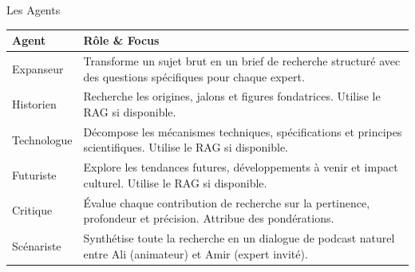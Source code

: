 \documentclass[aspectratio=169, 11pt]{beamer}
\begin{document}
\begin{frame}{Les Agents}
\vspace{0.1cm}
\centering
\footnotesize
\begin{tabularx}{0.95\textwidth}{l X}
  \toprule
  \textbf{Agent} & \textbf{Rôle \& Focus} \\
  \midrule
  \rowcolor{bglight} Expanseur & Transforme un sujet brut en un brief de recherche structuré avec des questions spécifiques pour chaque expert. \\
  Historien & Recherche les origines, jalons et figures fondatrices. Utilise le RAG si disponible. \\
  \rowcolor{bglight} Technologue & Décompose les mécanismes techniques, spécifications et principes scientifiques. Utilise le RAG si disponible. \\
  Futuriste & Explore les tendances futures, développements à venir et impact culturel. Utilise le RAG si disponible. \\
  \rowcolor{bglight} Critique & Évalue chaque contribution de recherche sur la pertinence, profondeur et précision. Attribue des pondérations. \\
  Scénariste & Synthétise toute la recherche en un dialogue de podcast naturel entre Ali (animateur) et Amir (expert invité). \\
  \bottomrule
\end{tabularx}
\end{frame}
\end{document}
